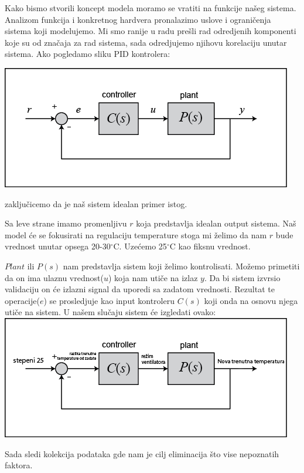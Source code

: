 \documentclass[a4paper,11pt]{book}
\begin{document}
Kako bismo stvorili koncept modela moramo se vratiti na funkcije našeg sistema. Analizom funkcija i konkretnog hardvera pronalazimo uslove i ograničenja sistema koji modelujemo. Mi smo ranije u radu prešli rad odredjenih komponenti koje su od značaja za rad sistema, sada odredjujemo njihovu korelaciju unutar sistema. Ako pogledamo sliku PID kontrolera:

\includegraphics[width=\textwidth]{feedback_block.png}

zaključicemo da je naš sistem idealan primer istog.

Sa leve strane imamo promenljivu $r$ koja predstavlja idealan output sistema. Naš model će se fokusirati na regulaciju temperature stoga mi želimo da nam $r$ bude vrednost unutar opsega 20-30$^\circ$C. Uzećemo 25$^\circ$C kao fiksnu vrednost. 

$Plant$ ili $P(s)$ nam predstavlja sistem koji želimo kontrolisati. Možemo primetiti da on ima ulaznu vrednost($u$) koja nam utiče na izlaz $y$. Da bi sistem izvrsio validaciju on će izlazni signal da uporedi sa zadatom vrednosti. Rezultat te operacije($e$) se prosledjuje kao input kontroleru $C(s)$ koji onda na osnovu njega utiče na sistem. U našem slučaju sistem će izgledati ovako:\\

\includegraphics[width=\textwidth]{feedback.png}

Sada sledi kolekcija podataka gde nam je cilj eliminacija što vise nepoznatih faktora.
\end{document}
